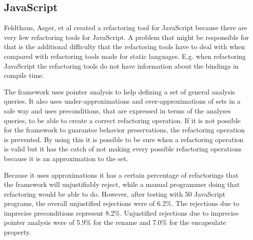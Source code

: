 \subsection{JavaScript}

Feldthaus, Asger, et al \cite{feldthaus2011tool} created a refactoring tool for JavaScript because there are very few refactoring tools for JavaScript. A problem that might be responsible for that is the additional difficulty that the refactoring tools have to deal with when compared with refactoring tools made for static languages. E.g. when refactoring JavaScript the refactoring tools do not have information about the bindings in compile time.



The framework uses pointer analysis to help defining a set of general analysis queries. 
It also uses under-approximations and over-approximations of sets in a safe way and uses preconditions, that are expressed in terms of the analyses queries, to be able to create a correct refactoring operation. 
If it is not possible for the framework to guarantee behavior preservations, the refactoring operation is prevented.
By using this it is possible to be sure when a refactoring operation is valid but it has the catch of not making every possible refactoring operations because it is an approximation to the set.



Because it uses approximations it has a certain percentage of refactorings that the framework will unjustifiably reject, while a manual programmer doing that refactoring would be able to do. 
However, after testing with 50 JavaScript programs, the overall unjustified rejections were of 6.2\%. 
The rejections due to imprecise preconditions represent 8.2\%.
Unjustified rejections due to imprecise pointer analysis were of 5.9\% for the rename and 7.0\% for the encapsulate property. 
